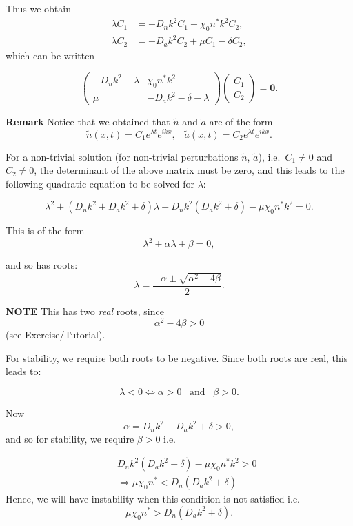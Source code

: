 \documentclass[
  letterpaper,
  DIV=11,
  numbers=noendperiod]{scrreprt}
\theoremstyle{definition}
\theoremstyle{plain}
\theoremstyle{plain}
\theoremstyle{remark}
\begin{document}
Thus we obtain \[
\begin{aligned}
\lambda C_1 & =  - D_n k^2 C_1  + \chi_0 n^* k^2 C_2,  \\
\lambda C_2 & = - D_a k^2 C_2 +  \mu C_1 - \delta C_2,
\end{aligned}
\] which can be written

\[
\left(
\begin{array}{cc}
- D_n k^2 - \lambda &  \chi_0 n^* k^2 \\
\mu & - D_a k^2 -\delta -\lambda 
\end{array}
\right) 
\left(
\begin{array}{c}
C_1 \\
C_2
\end{array}
\right) = \mathbf{0} .
\]

\textbf{Remark} Notice that we obtained that \(\tilde n\) and
\(\tilde a\) are of the form
\[\tilde{n}(x,t) = C_1 e^{\lambda t} e^{ikx}, \;\;\; \tilde{a}(x,t) = C_2 e^{\lambda t} e^{ikx}.\]

For a non-trivial solution (for non-trivial perturbations \(\tilde n\),
\(\tilde a\)), i.e.~\(C_1 \neq 0\) and \(C_2 \neq 0\), the determinant
of the above matrix must be zero, and this leads to the following
quadratic equation to be solved for \(\lambda\):

\[
\lambda^2 + \left( D_n k^2 + D_a k^2 + \delta \right) \lambda + D_n k^2 \left( D_a k^2 + \delta \right) - \mu \chi_0 n^* k^2 = 0.
\]

This is of the form \[
\lambda^2 + \alpha \lambda + \beta = 0,
\]

and so has roots: \[
\lambda = \frac{-\alpha \pm \sqrt{\alpha^2 - 4 \beta}}{2}.\]

\textbf{NOTE} This has two \emph{real} roots, since \[
\alpha^2 - 4 \beta > 0
\] (see Exercise/Tutorial).

For stability, we require both roots to be negative. Since both roots
are real, this leads to:

\[
\lambda < 0  \Leftrightarrow \alpha > 0 \;\;\; \text{and} \;\;\; \beta >0.
\]

Now \[\alpha = D_n k^2 + D_a k^2 + \delta > 0,
\] and so for stability, we require \(\beta > 0\) i.e.~

\[
\begin{aligned}
& & D_n k^2 \left( D_a k^2 + \delta \right) - \mu \chi_0 n^* k^2 > 0 \\
& & \Rightarrow \mu \chi_0 n^* <  D_n  \left( D_a k^2 + \delta \right)
\end{aligned}
\] Hence, we will have instability when this condition is not satisfied
i.e.~ \[
\mu \chi_0 n^* >  D_n  \left( D_a k^2 + \delta \right).
\]
\end{document}
